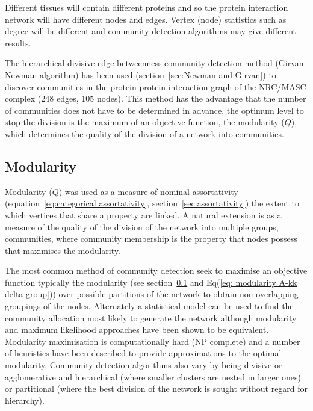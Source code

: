 Different tissues will contain different proteins and so the protein interaction network will have different nodes and edges. Vertex (node) statistics such as degree will be different and community detection algorithms may give different results.

The hierarchical divisive edge betweenness community detection method (Girvan–Newman algorithm) \cite{girvan2002community} has been used (section~\ref{sec:Newman and Girvan}) to discover communities in the protein-protein interaction graph of the NRC/MASC complex (248 edges, 105 nodes)\cite{pocklington2006proteomes}. This method has the advantage that the number of communities does not have to be determined in advance, the optimum level to stop the division is the maximum of an objective function, the modularity ($Q$), which determines the quality of the division of a network into communities\cite{girvan2002community}. 
 
\subsection{Modularity}
\label{sec:modularity introduction}
Modularity ($Q$) was used as a measure of nominal assortativity (equation~\ref{eq:categorical assortativity}, section~\ref{sec:assortativity}) the extent to which vertices that share a property are linked. A natural extension is as a measure of the quality of the division of the network into multiple groups, communities, where community membership is the property that nodes possess that maximises the modularity. 

 The most common method of community detection seek to maximise an objective function typically the modularity (see section~\ref{sec:modularity introduction} and Eq(\ref{eq: modularity A-kk delta group})) over possible partitions of the network to obtain non-overlapping groupings of the nodes\cite{newman2013spectral}. Alternately a statistical model can be used to find the community allocation most likely to generate the network although modularity and maximum likelihood approaches have been shown to be equivalent\cite{newman2016equivalence}. Modularity maximisation is computationally hard (NP complete\cite{brandes2007modularity}) and a number of heuristics have been described to provide approximations to the optimal modularity\cite{newman2013spectral}. Community detection algorithms also vary by being divisive or agglomerative and hierarchical (where smaller clusters are nested in larger ones) or partitional (where the best division of the network is sought without regard for hierarchy\cite{reichardt2006statistical}). 

